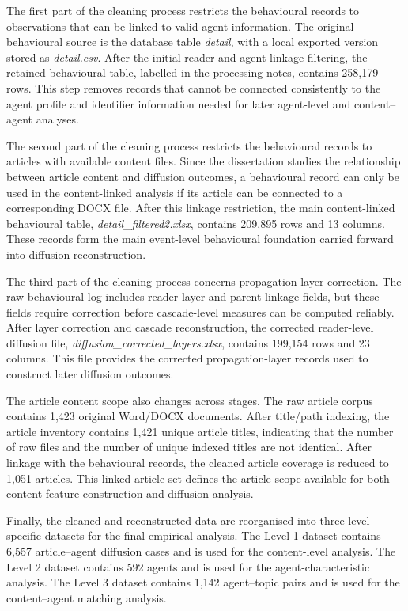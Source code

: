 The first part of the cleaning process restricts the behavioural records to observations that can be linked to valid agent information. The original behavioural source is the database table \emph{detail}, with a local exported version stored as \emph{detail.csv}. After the initial reader and agent linkage filtering, the retained behavioural table, labelled  in the processing notes, contains 258,179 rows. This step removes records that cannot be connected consistently to the agent profile and identifier information needed for later agent-level and content–agent analyses.

The second part of the cleaning process restricts the behavioural records to articles with available content files. Since the dissertation studies the relationship between article content and diffusion outcomes, a behavioural record can only be used in the content-linked analysis if its article can be connected to a corresponding DOCX file. After this linkage restriction, the main content-linked behavioural table, \emph{detail\_filtered2.xlsx}, contains 209,895 rows and 13 columns. These records form the main event-level behavioural foundation carried forward into diffusion reconstruction.

The third part of the cleaning process concerns propagation-layer correction. The raw behavioural log includes reader-layer and parent-linkage fields, but these fields require correction before cascade-level measures can be computed reliably. After layer correction and cascade reconstruction, the corrected reader-level diffusion file, \emph{diffusion\_corrected\_layers.xlsx}, contains 199,154 rows and 23 columns. This file provides the corrected propagation-layer records used to construct later diffusion outcomes.

The article content scope also changes across stages. The raw article corpus contains 1,423 original Word/DOCX documents. After title/path indexing, the article inventory contains 1,421 unique article titles, indicating that the number of raw files and the number of unique indexed titles are not identical. After linkage with the behavioural records, the cleaned article coverage is reduced to 1,051 articles. This linked article set defines the article scope available for both content feature construction and diffusion analysis.

Finally, the cleaned and reconstructed data are reorganised into three level-specific datasets for the final empirical analysis. The Level 1 dataset contains 6,557 article–agent diffusion cases and is used for the content-level analysis. The Level 2 dataset contains 592 agents and is used for the agent-characteristic analysis. The Level 3 dataset contains 1,142 agent–topic pairs and is used for the content–agent matching analysis.

